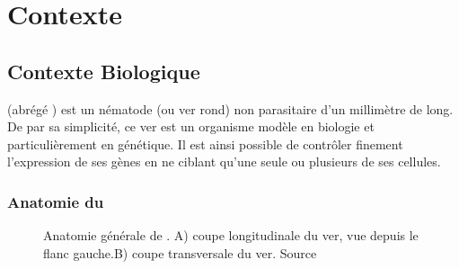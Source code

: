 \chapter{Contexte} %
\label{cha:Contexte}




\section{Contexte Biologique} %
\label{sec:Contexte Biologique}

\caeleg{} (abrégé \celeg{}) est un nématode (ou ver rond) non parasitaire d'un
millimètre de long. De par sa simplicité, ce ver est un organisme modèle en biologie
et particulièrement en génétique. Il est ainsi possible de contrôler
finement l'expression de ses gènes en ne ciblant qu'une seule ou plusieurs de
ses cellules.

\subsection{Anatomie du \celeg{}} %
\label{sub:Anatomie du caeleg}

\begin{figure}[ht]
   \begin{center}
   \end{center}
   \caption[Anatomie générale de \caeleg{}]{Anatomie générale de \caeleg{}. A) coupe longitudinale du ver,
   vue depuis le flanc gauche.B) coupe transversale du ver. Source
   \cite{Boyle2009}}
   \label{fig:celegans_anatomy}
\end{figure}

